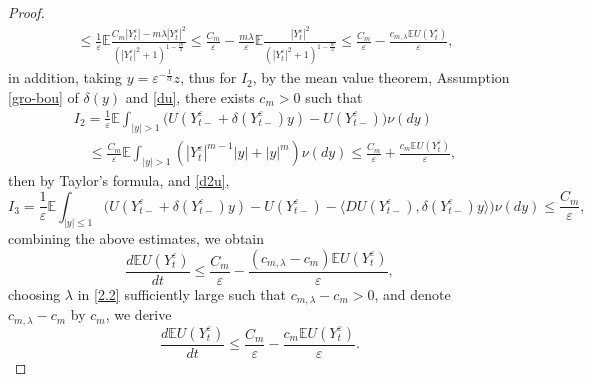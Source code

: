 \documentclass[11pt,reqno]{amsart}
\numberwithin{equation}{section}
\newcommand{\de}{\delta}
\begin{document}
\begin{proof}
\begin{align*}
&\leq  \frac{1}{\varepsilon}\mathbb{E} \frac{C_{m}|Y_{t}^{\varepsilon}|-m\lambda|Y_{t}^{\varepsilon}|^{2}}{(|Y_{t}^{\varepsilon}|^{2}+1)^{1-\frac{m}{2}}}
\leq\frac{C_{m}}{\varepsilon}
-\frac{m\lambda}{\varepsilon}
\mathbb{E}\frac{|Y_{t}^{\varepsilon}|^{2}}
{(|Y_{t}^{\varepsilon}|^{2}+1)^{1-\frac{m}{2}}}\leq \frac{C_{m}}{\varepsilon}-\frac{c_{m,\lambda}\mathbb{E}U(Y_{t}^{\varepsilon})}{\varepsilon},  
\end{align*}
	in addition, taking $y=\varepsilon^{-\frac{1}{\alpha}}z$,  
thus for $I_{2}$, by  the mean value theorem, Assumption \ref{gro-bou} of $ \delta(y)$ and \eqref{du}, there exists $ c_{m}>0$ such that
\begin{align*}
		&I_{2}=\frac{1}{\varepsilon}\mathbb{E} \int_{|y|> 1}\big( U(Y_{t-}^{\varepsilon}+\de(Y_{t-}^\varepsilon) y)-U(Y_{t-}^{\varepsilon}) \big) \nu(dy) \\
		&\quad\leq  \frac{C_{m}}{\varepsilon}\mathbb{E}\int_{|y|> 1}\left(|Y_{t}^{\varepsilon}|^{m-1}|y|+|y|^{m} \right) \nu(dy) \leq\frac{C_{m}}{\varepsilon}+\frac{c_{m}\mathbb{E}U(Y_{t}^{\varepsilon})}{\varepsilon},  
\end{align*}
then by Taylor's formula, and \eqref{d2u},
\begin{equation*}
I_{3}=\frac{1}{\varepsilon}\mathbb{E} \int_{|y|\leq 1}\big( U(Y_{t-}^{\varepsilon}+\de(Y_{t-}^\varepsilon) y)-U(Y_{t-}^{\varepsilon})-\langle  DU(Y_{t-}^{\varepsilon}),\de(Y_{t-}^\varepsilon) y\rangle  \big) \nu(dy)\leq  \frac{C_{m}}{\varepsilon},  
\end{equation*}
combining the above estimates, we obtain
\begin{equation*}
	\frac{d\mathbb{E}U(Y_{t}^{\varepsilon})}{dt}
	\leq\frac{C_{m}}{\varepsilon}
	-\frac{(c_{m,\lambda}-c_m)\mathbb{E}U(Y_{t}^{\varepsilon})}{\varepsilon},
\end{equation*}
choosing $\lambda$ in \eqref{2.2} sufficiently large such that
$c_{m,\lambda}-c_m>0$, and denote $c_{m,\lambda}-c_m$ by $c_m$, we derive
\begin{equation*}
	\frac{d\mathbb{E}U(Y_{t}^{\varepsilon})}{dt}
	\leq\frac{C_{m}}{\varepsilon}
	-\frac{c_{m}\mathbb{E}U(Y_{t}^{\varepsilon})}{\varepsilon}.
\end{equation*}

\end{proof}
\end{document}
